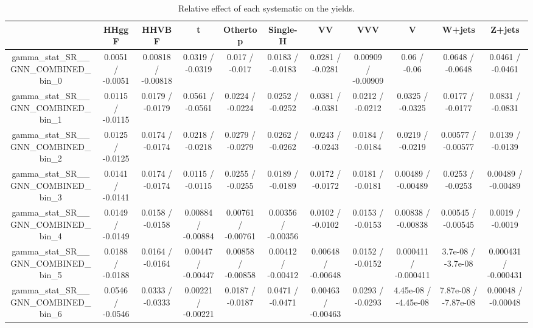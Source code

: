 \documentclass[10pt]{article}
\begin{document}
\begin{table}[htbp]
\begin{center}
\begin{tabular}{|c|c|c|c|c|c|c|c|c|c|c|}
\hline 
      & HHggF      & HHVBF      & t      & Othertop      & Single-H      & VV      & VVV      & V      & W+jets      & Z+jets \\ 
\hline 
  gamma_stat_SR__GNN_COMBINED_bin_0 & 0.0051 / -0.0051 & 0.00818 / -0.00818 & 0.0319 / -0.0319 & 0.017 / -0.017 & 0.0183 / -0.0183 & 0.0281 / -0.0281 & 0.00909 / -0.00909 & 0.06 / -0.06 & 0.0648 / -0.0648 & 0.0461 / -0.0461 \\ 
  gamma_stat_SR__GNN_COMBINED_bin_1 & 0.0115 / -0.0115 & 0.0179 / -0.0179 & 0.0561 / -0.0561 & 0.0224 / -0.0224 & 0.0252 / -0.0252 & 0.0381 / -0.0381 & 0.0212 / -0.0212 & 0.0325 / -0.0325 & 0.0177 / -0.0177 & 0.0831 / -0.0831 \\ 
  gamma_stat_SR__GNN_COMBINED_bin_2 & 0.0125 / -0.0125 & 0.0174 / -0.0174 & 0.0218 / -0.0218 & 0.0279 / -0.0279 & 0.0262 / -0.0262 & 0.0243 / -0.0243 & 0.0184 / -0.0184 & 0.0219 / -0.0219 & 0.00577 / -0.00577 & 0.0139 / -0.0139 \\ 
  gamma_stat_SR__GNN_COMBINED_bin_3 & 0.0141 / -0.0141 & 0.0174 / -0.0174 & 0.0115 / -0.0115 & 0.0255 / -0.0255 & 0.0189 / -0.0189 & 0.0172 / -0.0172 & 0.0181 / -0.0181 & 0.00489 / -0.00489 & 0.0253 / -0.0253 & 0.00489 / -0.00489 \\ 
  gamma_stat_SR__GNN_COMBINED_bin_4 & 0.0149 / -0.0149 & 0.0158 / -0.0158 & 0.00884 / -0.00884 & 0.00761 / -0.00761 & 0.00356 / -0.00356 & 0.0102 / -0.0102 & 0.0153 / -0.0153 & 0.00838 / -0.00838 & 0.00545 / -0.00545 & 0.0019 / -0.0019 \\ 
  gamma_stat_SR__GNN_COMBINED_bin_5 & 0.0188 / -0.0188 & 0.0164 / -0.0164 & 0.00447 / -0.00447 & 0.00858 / -0.00858 & 0.00412 / -0.00412 & 0.00648 / -0.00648 & 0.0152 / -0.0152 & 0.000411 / -0.000411 & 3.7e-08 / -3.7e-08 & 0.000431 / -0.000431 \\ 
  gamma_stat_SR__GNN_COMBINED_bin_6 & 0.0546 / -0.0546 & 0.0333 / -0.0333 & 0.00221 / -0.00221 & 0.0187 / -0.0187 & 0.0471 / -0.0471 & 0.00463 / -0.00463 & 0.0293 / -0.0293 & 4.45e-08 / -4.45e-08 & 7.87e-08 / -7.87e-08 & 0.00048 / -0.00048 \\ 
\hline 
\end{tabular} 
\caption{Relative effect of each systematic on the yields.} 
\end{center} 
\end{table} 
\end{document}
